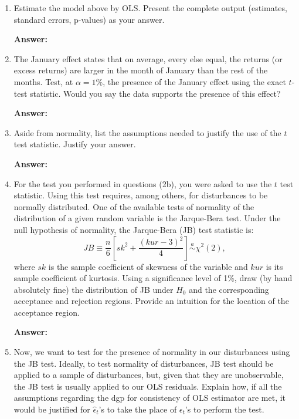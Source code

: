 \documentclass[12pt,a4paper]{article}
\begin{document}
\begin{enumerate}[label=(\alph*)]
  \item Estimate the model above by OLS. Present the complete output (estimates, standard errors, p-values) as your answer.
  
  \textbf{Answer:} 
  
  \item The January effect states that on average, every else equal, the returns (or excess returns) are larger in the month of January than the rest of the months. Test, at $\alpha = 1\%$, the presence of the January effect using the exact $t$-test statistic. Would you say the data supports the presence of this effect?
  
  \textbf{Answer:} 
  
  \item Aside from normality, list the assumptions needed to justify the use of the $t$ test statistic. Justify your answer.
  
  \textbf{Answer:} 
  
  \item For the test you performed in questions (2b), you were asked to use the $t$ test statistic. Using this test requires, among others, for disturbances to be normally distributed. One of the available tests of normality of the distribution of a given random variable is the Jarque-Bera test. Under the null hypothesis of normality, the Jarque-Bera (JB) test statistic is:
  \[
  JB \equiv \frac{n}{6}\left[sk^2 + \frac{(kur - 3)^2}{4}\right] \stackrel{a}{\sim} \chi^2(2),
  \]
  where $sk$ is the sample coefficient of skewness of the variable and $kur$ is its sample coefficient of kurtosis. Using a significance level of 1\%, draw (by hand absolutely fine) the distribution of JB under $H_0$ and the corresponding acceptance and rejection regions. Provide an intuition for the location of the acceptance region.
  
  \textbf{Answer:} 
  
  \item Now, we want to test for the presence of normality in our disturbances using the JB test. Ideally, to test normality of disturbances, JB test should be applied to a sample of disturbances, but, given that they are unobservable, the JB test is usually applied to our OLS residuals. Explain how, if all the assumptions regarding the dgp for consistency of OLS estimator are met, it would be justified for $\hat{\epsilon}_t$'s to take the place of $\epsilon_t$'s to perform the test.
  

\end{enumerate}
\end{document}
